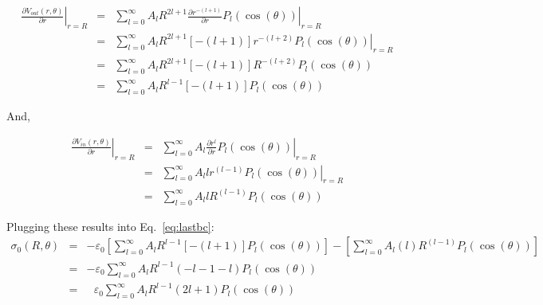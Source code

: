\documentclass[12pt]{article}
\begin{document}
\begin{flushleft}
\begin{eqnarray*}
 \left. \frac{\partial V_{out}(r,\theta)}{\partial r} \right|_{r=R} & = & 
 \left. \sum_{l=0}^{\infty} A_{l}R^{2l+1}\frac{\partial r^{-(l+1)}}{\partial r} P_{l}(\cos{(\theta)})  \right|_{r=R} \\
& =  & \left. \sum_{l=0}^{\infty} A_{l}R^{2l+1}[-(l+1)]r^{-(l+2)} P_{l}(\cos{(\theta)}) \right|_{r=R} \\
& = & \sum_{l=0}^{\infty} A_{l}R^{2l+1}[-(l+1)]R^{-(l+2)} P_{l}(\cos{(\theta)}) \\
& = & \sum_{l=0}^{\infty} A_{l}R^{l-1}[-(l+1)]P_{l}(\cos{(\theta)})
\end{eqnarray*}

And, 

\begin{eqnarray*}
 \left. \frac{\partial V_{in}(r,\theta)}{\partial r} \right|_{r=R} & = & 
\left. \sum_{l=0}^{\infty} A_{l}\frac{\partial r^{l}}{\partial r} P_{l}(\cos{(\theta)})  \right|_{r=R} \\
& =  & \left. \sum_{l=0}^{\infty} A_{l}lr^{(l-1)} P_{l}(\cos{(\theta)})  \right|_{r=R} \\
& = & \sum_{l=0}^{\infty} A_{l} l R^{(l-1)} P_{l}(\cos{(\theta)}) 
\end{eqnarray*}

Plugging these results into Eq.~\ref{eq:lastbc}: 
\begin{eqnarray}
\sigma_{0}(R,\theta) & = & -\varepsilon_{0}\left[  \sum_{l=0}^{\infty} A_{l}R^{l-1}[-(l+1)]P_{l}(\cos{(\theta)}) \right] -  \left[ \sum_{l=0}^{\infty} A_{l}( l )R^{(l-1)} P_{l}(\cos{(\theta)}) \right]  \nonumber \\[4pt]
& = & -\varepsilon_{0}\sum_{l=0}^{\infty} A_{l}R^{l-1}(-l-1-l )P_{l}(\cos{(\theta)}) \nonumber \\[4pt]
& = & \: \: \: \varepsilon_{0}\sum_{l=0}^{\infty} A_{l}R^{l-1}(2l+1)P_{l}(\cos{(\theta)}) 
\label{eq:hemilast}
\end{eqnarray}
\vspace{.2in}


\end{flushleft}
\end{document}
